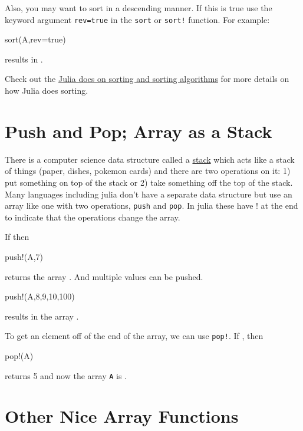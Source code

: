 Also, you may want to sort in a descending manner.  If this is true use the keyword argument \verb!rev=true! in the \verb!sort! or \verb|sort!| function.  For example:
\begin{jlblock}[array]
sort(A,rev=true)
\end{jlblock}
%
results in  \printpythontex[verb].




Check out the
\href{https://docs.julialang.org/en/v1/base/sort}{Julia
docs on sorting and sorting algorithms} for more details on how Julia does sorting.



\section{Push and Pop; Array as a Stack}

There is a computer science data structure called a \href{https://en.wikipedia.org/wiki/Stack\_(abstract\_data\_type)}{stack} which acts like a stack of things (paper, dishes, pokemon cards) and there are two operations on it: 1) put something on top of the stack or 2) take something off the top of the stack.  Many languages including julia don't have a separate data structure but use an array like one with two operations, \verb!push! and \verb!pop!.  In julia these have ! at the end to indicate that the operations change the array.  


If  then
%
\begin{jlblock}[array]
push!(A,7)
\end{jlblock}
%
returns the array \printpythontex[verb]. 
And multiple values can be pushed.
%
\begin{jlblock}[array]
push!(A,8,9,10,100)
\end{jlblock}

results in the array  \printpythontex[verb]. 

To get an element off of the end of the array, we can use \texttt{pop!}.
If , then

\begin{jlblock}[array]
pop!(A)
\end{jlblock}
%
returns 5 and now the array \verb!A! is  \printpythontex[verb]. 

\section{Other Nice Array Functions}

